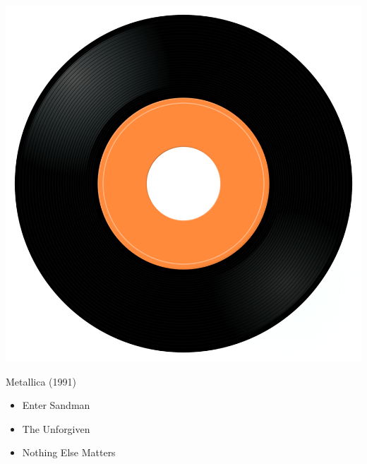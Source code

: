 \begin{minipage}[t]{0.25\textwidth}
\captionsetup{type=figure}
\includegraphics[width=\textwidth]{Images/cover.png}
\caption*{Metallica (1991)}
\end{minipage}
\begin{minipage}[t]{0.25\textwidth}\vspace{0pt}
\begin{itemize}[nosep,leftmargin=1em,labelwidth=*,align=left]
	\setlength{\itemsep}{0pt}
	\item Enter Sandman
	\item The Unforgiven
	\item Nothing Else Matters
\end{itemize}
\end{minipage}
